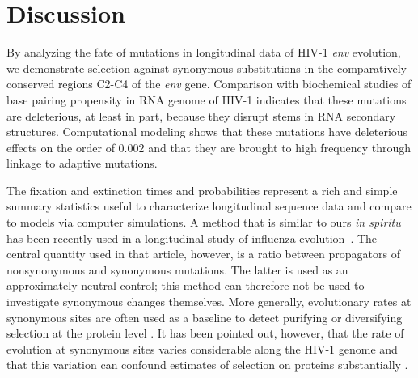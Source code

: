 \documentclass[10pt]{article}
\newcommand{\env}{\textit{env}}
\begin{document}
\section*{Discussion}
By analyzing the fate of mutations in longitudinal data of HIV-1 \env{} evolution,
we demonstrate selection against synonymous substitutions in the comparatively
conserved regions C2-C4 of the \env{} gene. Comparison with biochemical studies
of base pairing propensity in RNA genome of HIV-1 indicates that these
mutations are deleterious, at least in part, because they disrupt stems in RNA
secondary structures. Computational modeling shows that these mutations have
deleterious effects on the order of $0.002$ and that they are brought to high
frequency through linkage to adaptive mutations.

The fixation and extinction times and probabilities represent a rich and simple
summary statistics useful to characterize longitudinal sequence data and compare
to models via computer simulations. A method that is similar to ours {\it in
spiritu} has been recently used in a longitudinal study of influenza
evolution~\cite{strelkowa_clonal_2012}. The central quantity used in that
article, however, is a ratio between propagators of nonsynonymous and synonymous
mutations. The latter is used as an approximately neutral control; this method
can therefore not be used to investigate synonymous changes themselves. More
generally, evolutionary rates at synonymous sites are often used as a baseline
to detect purifying or diversifying selection at the protein level
\cite{Hurst:2002p32608}. It has been pointed out, however, that the rate of
evolution at synonymous sites varies considerable along the HIV-1 genome
\cite{mayrose_towards_2007} and that this variation can confound estimates of
selection on proteins substantially \cite{ngandu_extensive_2008}.
\end{document}
